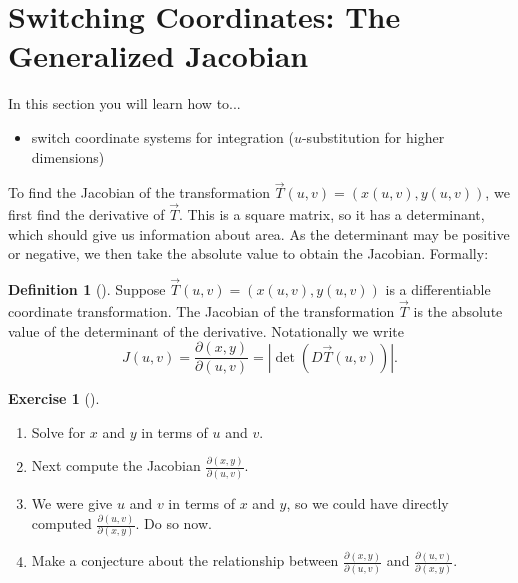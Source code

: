 \documentclass[10pt,]{book}
\theoremstyle{plain}
\theoremstyle{definition}
\newtheorem{definition}[theorem]{Definition}
\theoremstyle{definition}
\theoremstyle{definition}
\theoremstyle{definition}
\newtheorem{exploration}[project]{Exercise}
\theoremstyle{definition}
\numberwithin{equation}{section}
\begin{document}
\section[{Switching Coordinates: The Generalized Jacobian}]{Switching Coordinates: The Generalized Jacobian}\label{section-40}
In this section you will learn how to... \leavevmode%
\begin{itemize}[label=\textbullet]
\item{}switch coordinate systems for integration (\(u\)-substitution for higher dimensions)%
\end{itemize}
%
\par
To find the Jacobian of the transformation \(\vec T(u,v)=(x(u,v), y(u,v))\), we first find the derivative of \(\vec T\). This is a square matrix, so it has a determinant, which should give us information about area. As the determinant may be positive or negative, we then take the absolute value to obtain the Jacobian. Formally:%
\begin{definition}[{}]\label{definition-43}
Suppose \(\vec T(u,v)=(x(u,v),y(u,v))\) is a differentiable coordinate transformation. The Jacobian of the transformation \(\vec T\) is the absolute value of the determinant of the derivative. Notationally we write%
\begin{equation*}
J(u,v) = \frac{\partial (x,y)}{\partial (u,v)} = |\det(D\vec T(u,v))|.
\end{equation*}
%
\end{definition}
\begin{exploration}[]\label{exploration-267}
\leavevmode%
\begin{enumerate}[font=\bfseries,label=(\alph*),ref=\alph*]
\item\label{task-722} Solve for \(x\) and \(y\) in terms of \(u\) and \(v\).%
\item\label{task-723} Next compute the Jacobian \(\frac{\partial (x,y)}{\partial (u,v)}\).%
\item\label{task-724} We were give \(u\) and \(v\) in terms of \(x\) and \(y\), so we could have directly computed \(\frac{\partial (u,v)}{\partial (x,y)}\). Do so now.%
\item\label{task-725} Make a conjecture about the relationship between \(\frac{\partial (x,y)}{\partial (u,v)}\) and \(\frac{\partial (u,v)}{\partial (x,y)}\).%
\end{enumerate}
\end{exploration}
\end{document}
